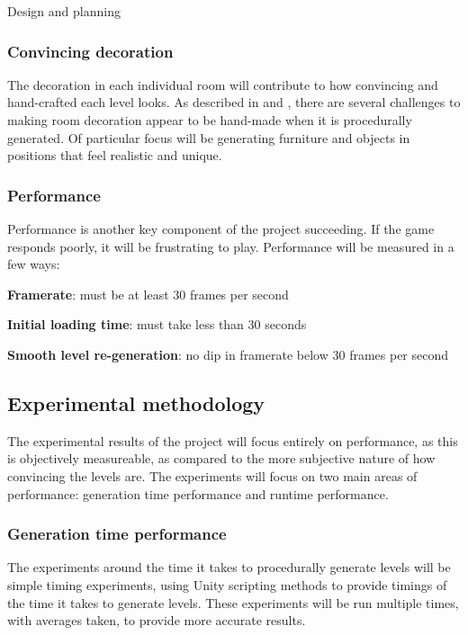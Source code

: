 \documentclass[final]{cmpreport}
\begin{document}
\begin{section}{Design and planning}
\subsubsection{Convincing decoration}
The decoration in each individual room will contribute to how convincing and hand-crafted each level looks. As described in \cite{doi:10.1111/j.1467-8659.2009.01351.x} and \cite{taylor-parberry}, there are several challenges to making room decoration appear to be hand-made when it is procedurally generated. Of particular focus will be generating furniture and objects in positions that feel realistic and unique.

\subsubsection{Performance}
Performance is another key component of the project succeeding. If the game responds poorly, it will be frustrating to play. Performance will be measured in a few ways:
\begin{compactitem}
    \item{\textbf{Framerate}: must be at least 30 frames per second}
    \item{\textbf{Initial loading time}: must take less than 30 seconds}
    \item{\textbf{Smooth level re-generation}: no dip in framerate below 30 frames per second}
\end{compactitem}

\subsection{Experimental methodology}
The experimental results of the project will focus entirely on performance, as this is objectively measureable, as compared to the more subjective nature of how convincing the levels are. The experiments will focus on two main areas of performance: generation time performance and runtime performance.

\subsubsection{Generation time performance}
The experiments around the time it takes to procedurally generate levels will be simple timing experiments, using Unity scripting methods to provide timings of the time it takes to generate levels. These experiments will be run multiple times, with averages taken, to provide more accurate results.


\end{section}
\end{document}
